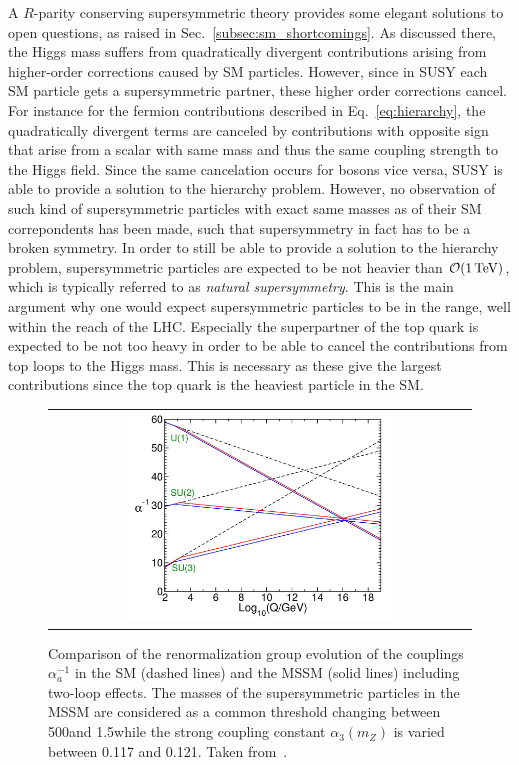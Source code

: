 A $R$-parity conserving supersymmetric theory provides some elegant solutions to open questions, as raised in Sec.~\ref{subsec:sm_shortcomings}. As discussed there, the Higgs mass suffers from quadratically divergent contributions arising from higher-order corrections caused by SM particles. However, since in SUSY each SM particle gets a supersymmetric partner, these higher order corrections cancel. For instance for the fermion contributions described in Eq.~\ref{eq:hierarchy}, the quadratically divergent terms are canceled by contributions with opposite sign that arise from a scalar with same mass and thus the same coupling strength to the Higgs field. Since the same cancelation occurs for bosons vice versa, SUSY is able to provide a solution to the hierarchy problem. However, no observation of such kind of supersymmetric particles with exact same masses as of their SM correpondents has been made, such that supersymmetry in fact has to be a broken symmetry. In order to still be able to provide a solution to the hierarchy problem, supersymmetric particles are expected to be not heavier than $\mathcal{O}(\mathrm{1\,\text{Te}\kern-0.06667em\text{V}})$, which is typically referred to as \textit{natural supersymmetry}. This is the main argument why one would expect supersymmetric particles to be in the \tev range, well within the reach of the LHC. Especially the superpartner of the top quark is expected to be not too heavy in order to be able to cancel the contributions from top loops to the Higgs mass. This is necessary as these give the largest contributions since the top quark is the heaviest particle in the SM. 
\begin{figure}[!tp]
  \centering
  \begin{tabular}{c}
    \includegraphics[width=0.65\textwidth]{figures/Couplings.jpg}
  \end{tabular}
  \caption{Comparison of the renormalization group evolution of the couplings $\alpha_{a}^{-1}$ in the SM (dashed lines) and the MSSM (solid lines) including two-loop effects. The masses of the supersymmetric particles in the MSSM are considered as a common threshold changing between 500\gev and 1.5\tev while the strong coupling constant $\alpha_{3}(m_{Z})$ is varied between 0.117 and 0.121. Taken from~\cite{Martin:1997ns}.}
  \label{fig:couplings}
\end{figure}

